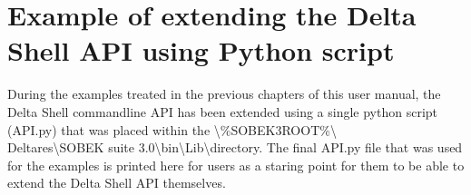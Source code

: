 
\chapter{Example of extending the Delta Shell API using Python script}\label{appendix}
During the examples treated in the previous chapters of this user manual, the Delta Shell commandline API has been extended using a single python script (API.py) that was placed within the \textbackslash\%SOBEK3ROOT\%\textbackslash \\ Deltares\textbackslash SOBEK suite 3.0\textbackslash bin\textbackslash Lib\textbackslash directory. The final API.py file that was used for the examples is printed here for users as a staring point for them to be able to extend the Delta Shell API themselves.
